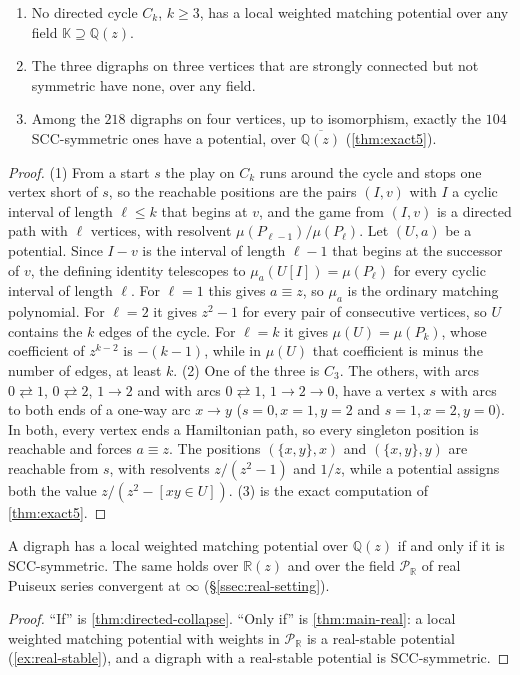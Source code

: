 \documentclass[final]{siamart0516}
\numberwithin{theorem}{section}
\numberwithin{equation}{section}
\theoremstyle{siamnonum}
\theoremstyle{plain}
\newcommand{\QQ}{\mathbb{Q}}
\newcommand{\RR}{\mathbb{R}}
\newcommand{\Qz}{\QQ(z)}
\newcommand{\Rz}{\RR(z)}
\newcommand{\Qzbar}{\overline{\QQ(z)}}
\newcommand{\Puis}{\mathcal{P}_{\RR}}
\begin{document}
\begin{proposition}\label{prop:fails}
\begin{enumerate}[label=\textup{(\arabic*)}]
\item No directed cycle $C_k$, $k\ge3$, has a local weighted matching potential over any field $\mathbb K\supseteq\Qz$.
\item The three digraphs on three vertices that are strongly connected but not symmetric have none, over any field.
\item Among the $218$ digraphs on four vertices, up to isomorphism, exactly the $104$ SCC-symmetric ones have a potential, over $\Qzbar$ \textup{(}\cref{thm:exact5}\textup{)}.
\end{enumerate}
\end{proposition}
\begin{proof}
(1) From a start $s$ the play on $C_k$ runs around the cycle and stops one vertex short of $s$, so the reachable positions are the pairs $(I,v)$ with $I$ a cyclic interval of length $\ell\le k$ that begins at $v$, and the game from $(I,v)$ is a directed path with $\ell$ vertices, with resolvent $\mu(P_{\ell-1})/\mu(P_\ell)$. Let $(U,a)$ be a potential. Since $I-v$ is the interval of length $\ell-1$ that begins at the successor of $v$, the defining identity telescopes to $\mu_a(U[I])=\mu(P_\ell)$ for every cyclic interval of length $\ell$. For $\ell=1$ this gives $a\equiv z$, so $\mu_a$ is the ordinary matching polynomial. For $\ell=2$ it gives $z^2-1$ for every pair of consecutive vertices, so $U$ contains the $k$ edges of the cycle. For $\ell=k$ it gives $\mu(U)=\mu(P_k)$, whose coefficient of $z^{k-2}$ is $-(k-1)$, while in $\mu(U)$ that coefficient is minus the number of edges, at least $k$.
(2) One of the three is $C_3$. The others, with arcs $0\rightleftarrows1$, $0\rightleftarrows2$, $1\to2$ and with arcs $0\rightleftarrows1$, $1\to2\to0$, have a vertex $s$ with arcs to both ends of a one-way arc $x\to y$ ($s=0,x=1,y=2$ and $s=1,x=2,y=0$). In both, every vertex ends a Hamiltonian path, so every singleton position is reachable and forces $a\equiv z$. The positions $(\{x,y\},x)$ and $(\{x,y\},y)$ are reachable from $s$, with resolvents $z/(z^2-1)$ and $1/z$, while a potential assigns both the value $z/(z^2-[xy\in U])$.
(3) is the exact computation of \cref{thm:exact5}.
\end{proof}

\begin{theorem}\label{thm:conj610}
A digraph has a local weighted matching potential over $\Qz$ if and only if it is SCC-symmetric. The same holds over $\Rz$ and over the field $\Puis$ of real Puiseux series convergent at $\infty$ \textup{(}\S\ref{ssec:real-setting}\textup{)}.
\end{theorem}
\begin{proof}
``If'' is \cref{thm:directed-collapse}. ``Only if'' is \cref{thm:main-real}: a local weighted matching potential with weights in $\Puis$ is a real-stable potential (\cref{ex:real-stable}), and a digraph with a real-stable potential is SCC-symmetric.
\end{proof}
\end{document}
